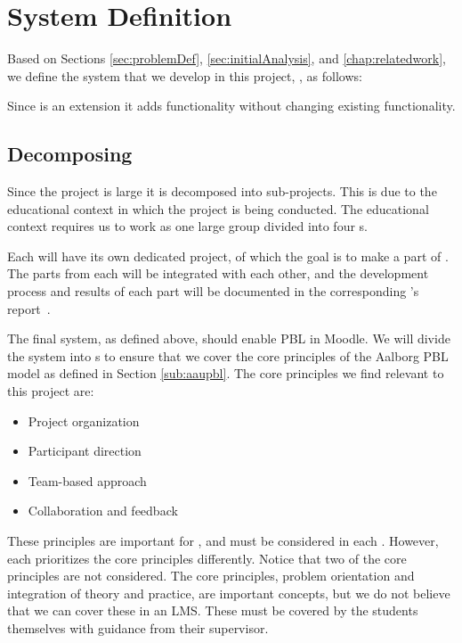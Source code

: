 \chapter{System Definition}
\label{sec:systemDef}
\label{chap:systemDef}
Based on Sections \vref{sec:problemDef}, \vref{sec:initialAnalysis}, and \vref{chap:relatedwork}, we define the system that we develop in this project, \system{}, as follows:


Since \system{} is an extension it adds functionality without changing existing functionality.


\section{Decomposing \system}
\label{sub:decomposingSys}
Since the project is large it is decomposed into sub-projects.
This is due to the educational context in which the project is being conducted.
The educational context requires us to work as one large group divided into four \subgroup{}s.

Each \subgroup{} will have its own dedicated project, of which the goal is to make a part of \system{}.
The parts from each \subgroup{} will be integrated with each other, and the development process and results of each part will be documented in the corresponding \subgroup{}'s report~\cite{sw6studieordning}.

The final system, as defined above, should enable PBL in Moodle.
We will divide the system into \subsystem{}s to ensure that we cover the core principles of the Aalborg PBL model as defined in Section \ref{sub:aaupbl}.
The core principles we find relevant to this project are:

\begin{itemize}
    \item Project organization
    \item Participant direction
    \item Team-based approach
    \item Collaboration and feedback
\end{itemize}

These principles are important for \system{}, and must be considered in each \subsystem{}.
However, each \subsystem{} prioritizes the core principles differently.
Notice that two of the core principles are not considered.
The core principles, problem orientation and integration of theory and practice, are important concepts, but we do not believe that we can cover these in an LMS.
These must be covered by the students themselves with guidance from their supervisor.

